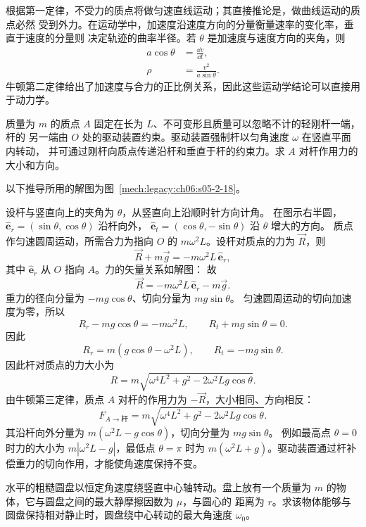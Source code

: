 {根据第一定律，不受力的质点将做匀速直线运动；其直接推论是，做曲线运动的质点必然
受到外力。在运动学中，加速度沿速度方向的分量衡量速率的变化率，垂直于速度的分量则
决定轨迹的曲率半径。若 $\theta$ 是加速度与速度方向的夹角，则
\begin{align}
 a\cos\theta&=\frac{\dd v}{\dd t}, \label{ch06:eq:s05-2-10}\\
 \rho&=\frac{v^2}{a\sin\theta}. \label{ch06:eq:s05-2-11}
\end{align}
牛顿第二定律给出了加速度与合力的正比例关系，因此这些运动学结论可以直接用于动力学。

\begin{origexamplebox}{}\label{ch06:ex:s05-2-18}
质量为 $m$ 的质点 $A$ 固定在长为 $L$、不可变形且质量可以忽略不计的轻刚杆一端，杆的
另一端由 $O$ 处的驱动装置约束。驱动装置强制杆以匀角速度 $\omega$ 在竖直平面内转动，
并可通过刚杆向质点传递沿杆和垂直于杆的约束力。求 $A$ 对杆作用力的大小和方向。
\probdiagTwoEighteen
\end{origexamplebox}

\begin{xesolution}
以下推导所用的解图为图~\ref{mech:legacy:ch06:s05-2-18}。

设杆与竖直向上的夹角为 $\theta$，从竖直向上沿顺时针方向计角。
在图示右半圆，$\hat{\boldsymbol e}_r=(\sin\theta,\cos\theta)$ 沿杆向外，
$\hat{\boldsymbol e}_t=(\cos\theta,-\sin\theta)$ 沿 $\theta$ 增大的方向。
质点作匀速圆周运动，所需合力为指向 $O$ 的
$m\omega^2L$。设杆对质点的力为 $\vec R$，则
\[
 \vec R+m\vec g=-m\omega^2L\,\hat{\boldsymbol e}_r,
\]
其中 $\hat{\boldsymbol e}_r$ 从 $O$ 指向 $A$。力的矢量关系如解图：
\soldiagTwoEighteen
故
\[
 \vec R=-m\omega^2L\,\hat{\boldsymbol e}_r-m\vec g.
\]
重力的径向分量为 $-mg\cos\theta$、切向分量为 $mg\sin\theta$。
匀速圆周运动的切向加速度为零，所以
\[
 R_r-mg\cos\theta=-m\omega^2L,\qquad R_t+mg\sin\theta=0.
\]
因此
\[
 R_r=m(g\cos\theta-\omega^2L),
 \qquad
 R_t=-mg\sin\theta.
\]
因此杆对质点的力大小为
\[
 R=m\sqrt{\omega^4L^2+g^2-2\omega^2Lg\cos\theta}.
\]
由牛顿第三定律，质点 $A$ 对杆的作用力为 $-\vec R$，大小相同、方向相反：
\[
 \boxed{F_{A\to\text{杆}}
 =m\sqrt{\omega^4L^2+g^2-2\omega^2Lg\cos\theta}}.
\]
其沿杆向外分量为 $m(\omega^2L-g\cos\theta)$，切向分量为 $mg\sin\theta$。
例如最高点 $\theta=0$ 时力的大小为 $m|\omega^2L-g|$，最低点 $\theta=\pi$ 时为
$m(\omega^2L+g)$。驱动装置通过杆补偿重力的切向作用，才能使角速度保持不变。
\end{xesolution}

\begin{origexamplebox}{}\label{ch06:ex:s05-2-19}
水平的粗糙圆盘以恒定角速度绕竖直中心轴转动。盘上放有一个质量为 $m$ 的物体，它与圆盘之间的最大静摩擦因数为 $\mu$，与圆心的
距离为 $r$。求该物体能够与圆盘保持相对静止时，圆盘绕中心转动的最大角速度
$\omega_0$。


\end{origexamplebox}}
